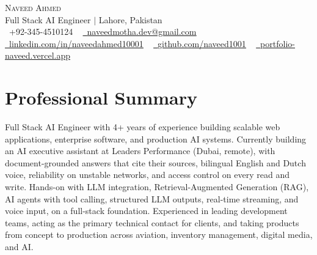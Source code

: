 \documentclass[letterpaper,11pt]{article}
\begin{document}
\begin{center}
  {\Huge \scshape Naveed Ahmed} \\ \vspace{1pt}
  Full Stack AI Engineer $|$ Lahore, Pakistan \\ \vspace{1pt}
  \small
  \raisebox{-0.1\height}\faPhone\ +92-345-4510124 ~
  \href{mailto:naveedmotha.dev@gmail.com}
    {\raisebox{-0.2\height}\faEnvelope\ \underline{naveedmotha.dev@gmail.com}} ~
  \href{https://linkedin.com/in/naveedahmed10001}
    {\raisebox{-0.2\height}\faLinkedin\ \underline{linkedin.com/in/naveedahmed10001}} ~
  \href{https://github.com/naveed1001}
    {\raisebox{-0.2\height}\faGithub\ \underline{github.com/naveed1001}} ~
  \href{https://portfolio-naveed.vercel.app/}
    {\raisebox{-0.2\height}\faGlobe\ \underline{portfolio-naveed.vercel.app}}
  \vspace{-8pt}
\end{center}

\section{Professional Summary}

Full Stack AI Engineer with 4+ years of experience building scalable web applications, enterprise software, and production AI systems. Currently building an AI executive assistant at Leaders Performance (Dubai, remote), with document-grounded answers that cite their sources, bilingual English and Dutch voice, reliability on unstable networks, and access control on every read and write. Hands-on with LLM integration, Retrieval-Augmented Generation (RAG), AI agents with tool calling, structured LLM outputs, real-time streaming, and voice input, on a full-stack foundation. Experienced in leading development teams, acting as the primary technical contact for clients, and taking products from concept to production across aviation, inventory management, digital media, and AI.

\vspace{-2pt}

\end{document}
